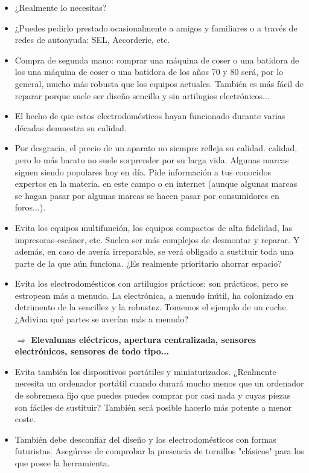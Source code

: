 \documentclass[a5paper,twoside,openany]{book}
\begin{document}
\begin{itemize}
\item ¿Realmente lo necesitas?
\item ¿Puedes pedirlo prestado ocasionalmente a amigos y familiares
o a través de redes de autoayuda: SEL, Accorderie, etc.
\item Compra de segunda mano: comprar una máquina de coser o una batidora de los
una máquina de coser o una batidora de los años 70 y 80 será, por lo general, mucho más robusta que los equipos actuales. También es más fácil de reparar porque suele ser diseño sencillo y sin artilugios electrónicos...
\item El hecho de que estos electrodomésticos hayan funcionado durante varias décadas demuestra su calidad.
\item Por desgracia, el precio de un aparato no siempre refleja su calidad.
calidad, pero lo más barato no suele sorprender por su larga
vida. Algunas marcas siguen siendo populares hoy en día. 
Pide información a tus conocidos expertos en la materia.
en este campo o en internet (aunque algunas marcas se hagan pasar por
algunas marcas se hacen pasar por consumidores en foros...).
\item Evita los equipos multifunción, los equipos compactos de alta fidelidad, las impresoras-escáner, etc. Suelen ser más complejos de desmontar y reparar. Y además, en caso de avería irreparable, se verá obligado a sustituir toda una parte de la que aún funciona.
¿Es realmente prioritario ahorrar espacio?
\item Evita los electrodomésticos con artilugios prácticos: son prácticos, pero se estropean más a menudo. La electrónica, a menudo inútil, ha colonizado en detrimento de la sencillez y la robustez.
Tomemos el ejemplo de un coche. ¿Adivina qué partes se averían más a menudo?

$\Rightarrow$ \textbf{Elevalunas eléctricos, apertura centralizada, sensores electrónicos, sensores de todo tipo...}

\item Evita también los dispositivos portátiles y miniaturizados.
¿Realmente necesita un ordenador portátil cuando durará mucho menos que un ordenador de sobremesa fijo que puedes puedes comprar por casi nada y cuyas piezas son fáciles de sustituir?
También será posible hacerlo más potente a menor coste.

\item También debe desconfiar del diseño y los electrodomésticos con
formas futuristas. Asegúrese de comprobar la presencia de tornillos "clásicos" para los que posee la herramienta. 


\end{itemize}
\end{document}
